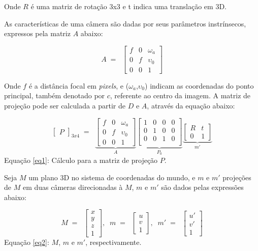 Onde $R$ é uma matriz de rotação 3x3 e t indica uma translação em 3D.

As características de uma câmera são dadas por seus parâmetros instrínsecos, expressos pela matriz $A$ abaixo:

\begin{equation}
A \; = \; \;
\begin{bmatrix}
		f & 0 & \omega_{a} \\
		0 & f & \upsilon_{0} \\
		0 & 0 & 1
\end{bmatrix}
\end{equation}

Onde $f$ é a distância focal em \textit{pixels}, e ($\omega_{a}$,$\upsilon_{0}$) indicam as coordenadas do ponto principal, também denotado por $c$, referente ao centro da imagem.
A matriz de projeção pode ser calculada a partir de $D$ e $A$, através da equação abaixo:

\begin{equation}\label{eq1}
\begin{bmatrix}
		P
\end{bmatrix}_{3x4}	\; = \; \;
\underbrace{\begin{bmatrix}
		f & 0 & \omega_{a} \\
		0 & f & \upsilon_{0} \\
		0 & 0 & 1
\end{bmatrix}
}_{A}
\underbrace{\begin{bmatrix}
		1&0&0&0 \\
		0&1&0&0 \\
		0&0&1&0 \\
\end{bmatrix}}_{P_{0}}	
\underbrace{\begin{bmatrix}
		R & t \\
		0 & 1		
	\end{bmatrix}}_{m'}
\end{equation}
Equação \eqref{eq1}: Cálculo para a matriz de projeção $P$.

Seja $M$ um plano 3D no sistema de coordenadas do mundo, e $m$ e $m'$ projeções de $M$ em duas câmeras direcionadas à $M$, $m$ e $m'$ são dados pelas expressões abaixo:

\begin{equation}\label{eq2}
M \; = \; \;
\begin{bmatrix}
x \\ y \\ z \\ 1
\end{bmatrix}, \; \;
m \; = \; \;
\begin{bmatrix}
u \\ v \\ 1
\end{bmatrix}, \;\;
m' \; = \; \;
\begin{bmatrix}
u' \\ v' \\ 1
\end{bmatrix}
\end{equation}
Equação \eqref{eq2}: $M$, $m$ e $m'$, respectivamente.

